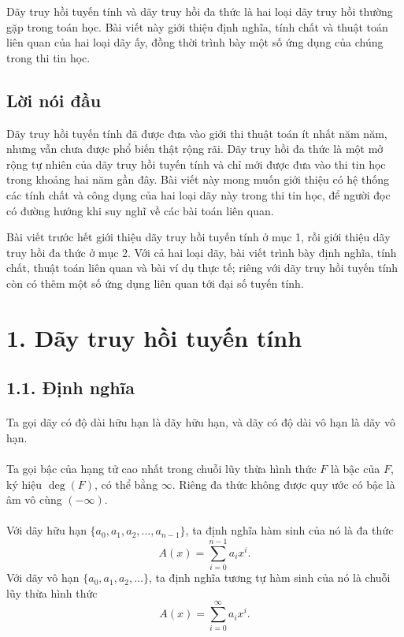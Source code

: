 \documentclass[11pt]{article}
\begin{document}
Dãy truy hồi tuyến tính và dãy truy hồi đa thức là hai loại dãy truy hồi
thường gặp trong toán học. Bài viết này giới thiệu định nghĩa, tính chất và
thuật toán liên quan của hai loại dãy ấy, đồng thời trình bày một số ứng dụng
của chúng trong thi tin học.

\subsection*{Lời nói đầu}

Dãy truy hồi tuyến tính đã được đưa vào giới thi thuật toán ít nhất năm năm,
nhưng vẫn chưa được phổ biến thật rộng rãi. Dãy truy hồi đa thức là một mở
rộng tự nhiên của dãy truy hồi tuyến tính và chỉ mới được đưa vào thi tin học
trong khoảng hai năm gần đây. Bài viết này mong muốn giới thiệu có hệ thống
các tính chất và công dụng của hai loại dãy này trong thi tin học, để người
đọc có đường hướng khi suy nghĩ về các bài toán liên quan.

Bài viết trước hết giới thiệu dãy truy hồi tuyến tính ở mục 1, rồi giới thiệu
dãy truy hồi đa thức ở mục 2. Với cả hai loại dãy, bài viết trình bày định
nghĩa, tính chất, thuật toán liên quan và bài ví dụ thực tế; riêng với dãy
truy hồi tuyến tính còn có thêm một số ứng dụng liên quan tới đại số tuyến
tính.

\section*{1. Dãy truy hồi tuyến tính}

\subsection*{1.1. Định nghĩa}

\paragraph{}
Ta gọi dãy có độ dài hữu hạn là dãy hữu hạn, và dãy có độ dài vô hạn là dãy
vô hạn.

\paragraph{}
Ta gọi bậc của hạng tử cao nhất trong chuỗi lũy thừa hình thức \(F\) là bậc
của \(F\), ký hiệu \(\deg(F)\), có thể bằng \(\infty\). Riêng đa thức không
được quy ước có bậc là âm vô cùng \((-\infty)\).

\paragraph{}
Với dãy hữu hạn \(\{a_0,a_1,a_2,\ldots,a_{n-1}\}\), ta định nghĩa hàm sinh
của nó là đa thức
\[
  A(x)=\sum_{i=0}^{n-1}a_i x^i.
\]
Với dãy vô hạn \(\{a_0,a_1,a_2,\ldots\}\), ta định nghĩa tương tự hàm sinh của
nó là chuỗi lũy thừa hình thức
\[
  A(x)=\sum_{i=0}^{\infty}a_i x^i.
\]
\end{document}
